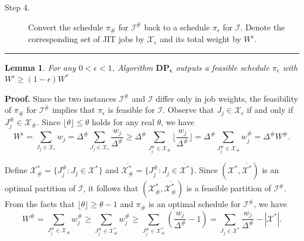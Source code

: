 \documentclass[12pt, eqno, limlimits]{article}
\newtheorem{lemma}{Lemma}[section]
\begin{document}
\begin{sloppypar}
\begin{algorithm}[tbp]
\begin{description}
                \item[Step 4.] Convert the schedule $\pi_{\#}$ for $\mathcal{I}^{\#}$ back to a schedule $\pi_{\epsilon}$ for $\mathcal{I}$. Denote the corresponding set of JIT jobs by $\mathcal{X}_{\epsilon}$ and its total weight by $W^{\epsilon}$.
            \end{description}
            \vspace{0.1cm}
            \hrule 
        \end{algorithm}
        
        
        \begin{lemma} \label{Lem-3.4}
            For any $0 < \epsilon <1$, Algorithm $\mathbf{DP_{\epsilon}}$ outputs a feasible schedule $\pi_{\epsilon}$ with $W^{\epsilon} \geq (1-\epsilon) W^{*}$
        \end{lemma}
        
        \noindent\textbf{Proof.} Since the two instances $\mathcal{I}^{\#}$ and $\mathcal{I}$ differ only in job weights, the feasibility of $\pi_{\#}$ for $\mathcal{I}^{\#}$ implies that $\pi_{\epsilon}$ is feasible for $\mathcal{I}$. Observe that $J_j \in  \mathcal{X}_{\epsilon}$ if and only if $J_j^{\#} \in \mathcal{X}_{\#}$. Since $\lfloor \theta \rfloor \leq \theta$ holds for any real $\theta$, we have 
        \begin{equation} \label{Eq-R1}
            W^{\epsilon} = \sum_{J_j \in \mathcal{X}_{\epsilon}} w_j 
            = \Delta^{\#} \sum_{J_j \in \mathcal{X}_{\epsilon}} \frac{w_j}{\Delta^{\#}} 
            \geq \Delta^{\#} \sum_{J_j^{\#} \in \mathcal{X}_{\#}} \lfloor \frac{w_j}{\Delta^{\#}} \rfloor
            = \Delta^{\#} \sum_{J_j^{\#} \in \mathcal{X}_{\#}} w_j^{\#}= \Delta^{\#} W^{\#}.
        \end{equation}
        
        Define $\mathcal{X}^{*}_{\#}=\{J_j^{\#}: J_j \in \mathcal{X}^{*}\}$ and $\overline{\mathcal{X}^{*}_{\#}}=\{J_j^{\#}: J_j \in \overline{\mathcal{X}^{*}}\}$. Since $(\mathcal{X}^{*}, \overline{\mathcal{X}^{*}})$ is an optimal partition of $\mathcal{I}$, it follows that $(\mathcal{X}^{*}_{\#}, \overline{\mathcal{X}^{*}_{\#}})$ is a feasible partition of $\mathcal{I}^{\#}$. From the facts that $\lfloor \theta \rfloor \geq \theta-1$ and $\pi_{\#}$ is an optimal schedule for $\mathcal{I}^{\#}$, we have 
        \begin{equation} \label{Eq-R2}
            W^{\#}=\sum_{J_j^{\#} \in \mathcal{X}_{\#}} w_j^{\#} 
            \geq \sum_{J_j^{\#} \in \mathcal{X}^{*}_{\#}} w_j^{\#}
            \geq \sum_{J_j^{\#} \in \mathcal{X}^{*}_{\#}}(\frac{w_j}{\Delta^{\#}}-1) 
            = \sum_{J_j \in \mathcal{X}^{*}}\frac{w_j}{\Delta^{\#}}-|\mathcal{X}^{*}|.
        \end{equation}
        

\end{sloppypar}
\end{document}
